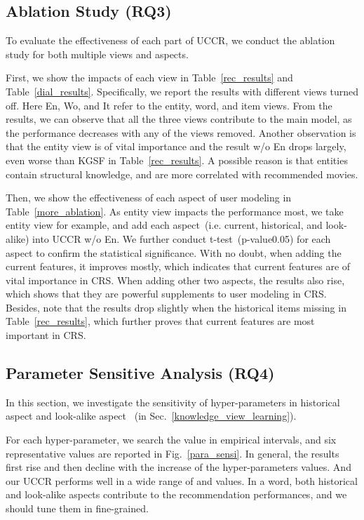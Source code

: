 \documentclass[sigconf,natbib=true]{acmart}
\begin{document}
\subsection{Ablation Study (RQ3)}
\label{ablation}

To evaluate the effectiveness of each part of UCCR, we conduct the ablation study for both multiple views and aspects.

First, we show the impacts of each view in Table~\ref{rec_results} and Table~\ref{dial_results}. Specifically, we report the results with different views turned off. Here En, Wo, and It refer to the entity, word, and item views. From the results, we can observe that all the three views contribute to the main model, as the performance decreases with any of the views removed. Another observation is that the entity view is of vital importance and the result w/o En drops largely, even worse than KGSF in Table~\ref{rec_results}. A possible reason is that entities contain structural knowledge, and are more correlated with recommended movies.



Then, we show the effectiveness of each aspect of user modeling in Table~\ref{more_ablation}. As entity view impacts the performance most, we take entity view for example, and add each aspect~(i.e. current, historical, and look-alike) into UCCR w/o En. We further conduct t-test~(p-value0.05) for each aspect to confirm the statistical significance.
With no doubt, when adding the current features, it improves mostly, which indicates that current features are of vital importance in CRS. When adding other two aspects, the results also rise, which shows that they are powerful supplements to user modeling in CRS. Besides, note that the results drop slightly when the historical items missing in Table~\ref{rec_results}, which further proves that current features are most important in CRS.





\subsection{Parameter Sensitive Analysis (RQ4)}

In this section, we investigate the sensitivity of hyper-parameters in historical aspect  and look-alike aspect ~(in Sec.~\ref{knowledge_view_learning}).

For each hyper-parameter, we search the value in empirical intervals, and six representative values are reported in Fig.~\ref{para_sensi}. In general, the results first rise and then decline with the increase of the hyper-parameters values. And our UCCR performs well in a wide range of  and  values. In a word, both historical and look-alike aspects contribute to the recommendation performances, and we should tune them in fine-grained.
\end{document}
